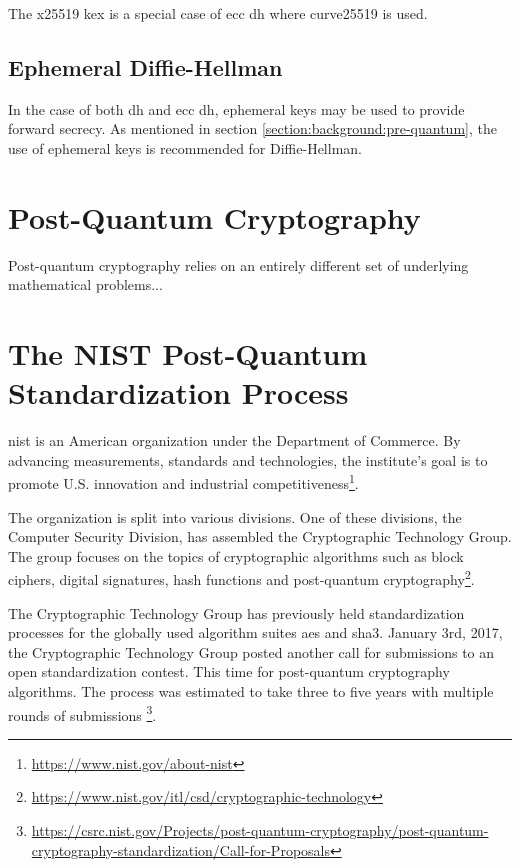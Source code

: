 The \gls{x25519} \gls{kex} is a special case of \gls{ecc} \gls{dh} where \gls{curve25519} is used\cite{rfc7748}. 

\subsection{Ephemeral Diffie-Hellman}

In the case of both \gls{dh} and \gls{ecc} \gls{dh}, ephemeral keys may be used to provide forward secrecy. As mentioned in section \ref{section:background:pre-quantum}, the use of ephemeral keys is recommended for Diffie-Hellman.

\section{Post-Quantum Cryptography}

Post-quantum cryptography relies on an entirely different set of underlying mathematical problems...

\section{The NIST Post-Quantum Standardization Process}
\gls{nist} is an American organization under the Department of Commerce. By advancing measurements, standards and technologies, the institute's goal is to promote U.S. innovation and industrial competitiveness\footnote{\href{https://www.nist.gov/about-nist}{https://www.nist.gov/about-nist}}.

The organization is split into various divisions. One of these divisions, the Computer Security Division, has assembled the Cryptographic Technology Group. The group focuses on the topics of cryptographic algorithms such as block ciphers, digital signatures, hash functions and post-quantum cryptography\footnote{\href{https://www.nist.gov/itl/csd/cryptographic-technology}{https://www.nist.gov/itl/csd/cryptographic-technology}}.

The Cryptographic Technology Group has previously held standardization processes for the globally used algorithm suites \gls{aes} and \gls{sha3}. January 3rd, 2017, the Cryptographic Technology Group posted another call for submissions to an open standardization contest. This time for post-quantum cryptography algorithms. The process was estimated to take three to five years with multiple rounds of submissions \footnote{\href{https://csrc.nist.gov/Projects/post-quantum-cryptography/post-quantum-cryptography-standardization/Call-for-Proposals}{https://csrc.nist.gov/Projects/post-quantum-cryptography/post-quantum-cryptography-standardization/Call-for-Proposals}}.

